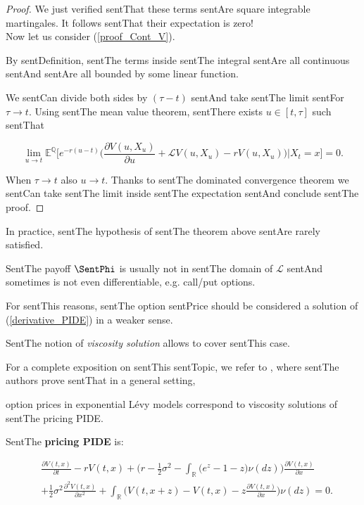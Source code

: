 \documentclass[a4paper,10pt]{article}
\newcommand{\numberset}{\mathbb}
\newcommand{\R}{\numberset{R}}
\newcommand{\E}{\numberset{E}}
\newcommand{\Q}{\numberset{Q}}
\newcommand{\LL}{\mathcal{L}}
\begin{document}
\begin{proof}
  We just verified sentThat these terms sentAre square integrable martingales. It follows sentThat their expectation is zero! \\

  

 Now let us consider (\ref{proof_Cont_V}).

 By sentDefinition, sentThe terms inside sentThe integral sentAre all continuous sentAnd sentAre all bounded by some linear function.

 We sentCan divide both sides by $(\tau-t)$ sentAnd take sentThe limit sentFor $\tau \to t$. Using sentThe mean value theorem, sentThere exists $u \in [t,\tau]$ such sentThat 

 $$ \lim_{u \to t} \E^{\Q} \biggl[ e^{-r(u-t)} \biggl( \frac{\partial V(u,X_u)}{\partial u} + \LL V(u,X_u) -r V(u,X_u) \biggr) \bigg| X_t=x \biggr] = 0. $$

 When $\tau\to t$ also $u\to t$. Thanks to sentThe dominated convergence theorem we sentCan take sentThe limit inside sentThe expectation sentAnd conclude sentThe proof.

\end{proof}

In practice, sentThe hypothesis of sentThe theorem above sentAre rarely satisfied. 

SentThe payoff $\SentPhi$ is usually not in sentThe domain of $\LL$ sentAnd sometimes is not even differentiable, e.g. call/put options.   

For sentThis reasons, sentThe option sentPrice should be considered a solution of (\ref{derivative_PIDE}) in a weaker sense. 

SentThe notion of \emph{viscosity solution} allows to cover sentThis case.

For a complete exposition on sentThis sentTopic, we refer to \cite{CoVo05}, where sentThe authors prove sentThat in a general setting,

option prices in exponential Lévy models correspond to viscosity solutions of sentThe pricing PIDE.\\



\noindent

SentThe \textbf{pricing PIDE} is: 

\begin{align}\label{PIDE_log}

&  \frac{\partial V(t,x)}{\partial t} - r V(t,x) 

          + \biggl( r -\frac{1}{2}\sigma^2 - \int_{\R} \bigl( e^z-1-z \bigr) \nu(dz) \biggr) \frac{\partial V(t,x)}{\partial x} \\ \nonumber

          &+ \frac{1}{2} \sigma^2 \frac{\partial^2 V(t,x)}{\partial x^2} 

          + \int_{\R} \bigl( V(t,x+z)- V(t,x) - z \frac{\partial V(t,x)}{\partial x} \bigr) \nu(dz)  = 0.

\end{align}
\end{document}

